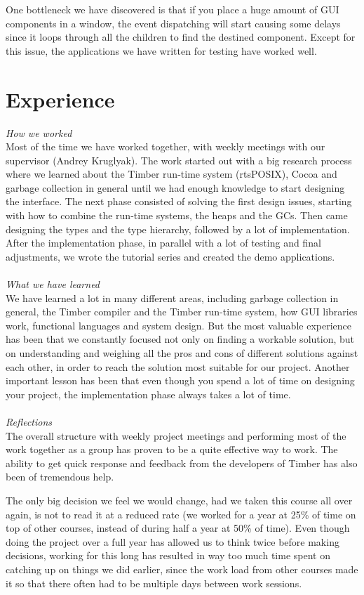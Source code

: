 \documentclass[a4paper]{article}
\begin{document}
One bottleneck we have discovered is that if you place a huge amount of GUI components in a window, the event dispatching will start causing some delays since it loops through all the children to find the destined component. Except for this issue, the applications we have written for testing have worked well.

\section{Experience}
\textit{How we worked}\\
Most of the time we have worked together, with weekly meetings with our supervisor (Andrey Kruglyak). The work started out with a big research process where we learned about the Timber run-time system (rtsPOSIX), Cocoa and garbage collection in general until we had enough knowledge to start designing the interface. The next phase consisted of solving the first design issues, starting with how to combine the run-time systems, the heaps and the GCs. Then came designing the types and the type hierarchy, followed by a lot of implementation. After the implementation phase, in parallel with a lot of testing and final adjustments, we wrote the tutorial series and created the demo applications.
\\ \\ \textit{What we have learned}\\
We have learned a lot in many different areas, including garbage collection in general, the Timber compiler and the Timber run-time system, how GUI libraries work, functional languages and system design. But the most valuable experience has been that we constantly focused not only on finding a workable solution, but on understanding and weighing all the pros and cons of different solutions against each other, in order to reach the solution most suitable for our project. Another important lesson has been that even though you spend a lot of time on designing your project, the implementation phase always takes a lot of time. 
\\ \\ \textit{Reflections}\\
The overall structure with weekly project meetings and performing most of the work together as a group has proven to be a quite effective way to work. The ability to get quick response and feedback from the developers of Timber has also been of tremendous help.

The only big decision we feel we would change, had we taken this course all over again, is not to read it at a reduced rate (we worked for a year at 25\% of time on top of other courses, instead of during half a year at 50\% of time). Even though doing the project over a full year has allowed us to think twice before making decisions, working for this long has resulted in way too much time spent on catching up on things we did earlier, since the work load from other courses made it so that there often had to be multiple days between work sessions.
\end{document}
